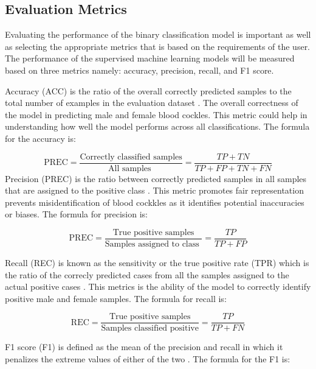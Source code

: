 \subsection{Evaluation Metrics}
Evaluating the performance of the binary classification model is important as well as selecting the appropriate metrics that is based on the requirements of the user. The performance of the supervised machine learning models will be measured based on three metrics namely: accuracy, precision, recall, and F1 score. 

Accuracy (ACC) is the ratio of the overall correctly predicted samples to the total number of examples in the evaluation dataset \cite{cui2020}. The overall correctness of the model in predicting male and female blood cockles. This metric could help in understanding how well the model performs across all classifications. The formula for the accuracy is: 

\begin{equation}
	\text{PREC} = \frac{\text{Correctly classified samples}} {\text{All samples }} = \frac{TP+ TN}{TP + FP + TN + FN}
	\label{eq:acc}
\end{equation}
Precision (PREC) is the ratio between correctly predicted samples in all samples that are assigned to the positive class \cite{cui2020}. This metric promotes fair representation prevents misidentification of blood cockkles as it identifies potential inaccuracies or biases. The formula for precision is:


\begin{equation}
	\text{PREC} = \frac{\text{True positive samples}} {\text{Samples assigned to class }} = \frac{TP}{TP + FP}
	\label{eq:prec}
\end{equation}

Recall (REC) is known as the sensitivity or the true positive rate (TPR) which is the ratio of the correcly predicted cases from all the samples assigned to the actual positive cases \cite{cui2020}. This metrics is the ability of the model to correctly identify positive male and female samples. The formula for recall is:

\begin{equation}
	\text{REC} = \frac{\text{True positive samples}} {\text{Samples classified positive}} = \frac{TP}{TP + FN}
	\label{eq:rec}
\end{equation}

F1 score (F1) is defined as the mean of the precision and recall in which it penalizes the extreme values of either of the two \cite{cui2020}. The formula for the F1 is: 

